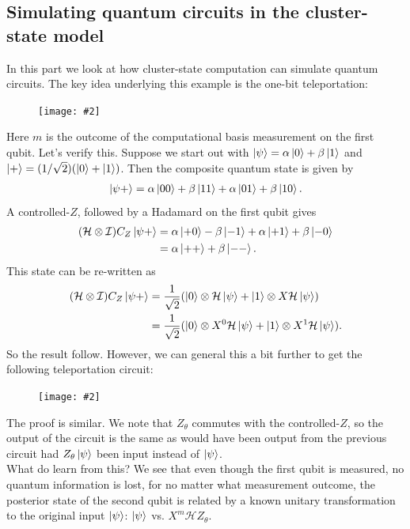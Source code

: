 \documentclass{book}
\theoremstyle{definition}
\newcommand{\nn}{\nonumber}
\newcommand{\had}{\mathcal{H}}
\newcommand{\al}{\alpha}
\newcommand{\be}{\beta}
\newcommand{\f}[2]{\frac{#1}{#2}}
\newcommand{\fig}[2]{
	\begin{figure}[!htb]
		\centering
		\texttt{[image: \#2]}
	\end{figure}}
\newcommand{\Id}{\mathcal{I}}
\begin{document}
 




\subsection{Simulating quantum circuits in the cluster-state model}

In this part we look at how cluster-state computation can simulate quantum circuits. The key idea underlying this example is the one-bit teleportation: 

\fig{0.5}{tele}

Here $m$ is the outcome of the computational basis measurement on the first qubit. Let's verify this. Suppose we start out with $\ket{\psi} = \al\ket{0} + \be\ket{1}$ and $\ket{+} = (1/\sqrt{2})(\ket{0} + \ket{1})$. Then the composite quantum state is given by
\begin{align}
\ket{\psi +} = \al\ket{00} + \beta\ket{11} + \al\ket{01} + \be\ket{10}.
\end{align}
A controlled-$Z$, followed by a Hadamard on the first qubit gives
\begin{align}
(\had \otimes \Id) C_Z\ket{\psi +} &= \al\ket{+0} - \be\ket{-1} + \al\ket{+1} + \be\ket{-0} \nn\\
&= \al\ket{++} + \be\ket{--}.
\end{align}
This state can be re-written as 
\begin{align}
(\had \otimes \Id) C_Z\ket{\psi +} &= \f{1}{\sqrt{2}}(\ket{0} \otimes \had \ket{\psi} + \ket{1}\otimes X \had\ket{\psi})\nn\\
&= \f{1}{\sqrt{2}}(\ket{0} \otimes X^0 \had \ket{\psi} + \ket{1}\otimes X^1 \had\ket{\psi}).
\end{align}
So the result follow. However, we can general this a bit further to get the following teleportation circuit:

\fig{0.4}{tele1}

The proof is similar. We note that $Z_\theta$ commutes with the controlled-$Z$, so the output of the circuit is the same as would have been output from the previous circuit had $Z_\theta\ket{\psi}$ been input instead of $\ket{\psi}$.  \\

What do learn from this? We see that even though the first qubit is measured, no quantum information is lost, for no matter what measurement outcome, the posterior state of the second qubit is related by a known unitary transformation to the original input $\ket{\psi}$: $\ket{\psi}$ vs. $X^m \had Z_\theta$. \\
\end{document}
